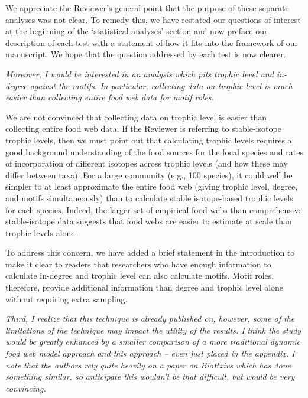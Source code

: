 \documentclass[12pt]{article}
\newcommand{\us}{\rm \setlength{\leftskip}{0.3cm} \setlength{\rightskip}{0.3cm}}
\newcommand{\them}{\it \setlength{\leftskip}{0cm} \setlength{\rightskip}{0cm}}
\begin{document}
        We appreciate the Reviewer's general point that the purpose of these separate analyses was not clear. To remedy this, we have restated our questions of interest at the beginning of the `statistical analyses' section and now preface our description of each test with a statement of how it fits into the framework of our manuscript. We hope that the question addressed by each test is now clearer.
        
        \them
        Moreover, I would be interested in an analysis which pits trophic level and in-degree against the motifs. In particular, collecting data on trophic level is much easier than collecting entire food web data for motif roles.
        
        \us
        We are not convinced that collecting data on trophic level is easier than collecting entire food web data. If the Reviewer is referring to stable-isotope trophic levels, then we must point out that calculating trophic levels requires a good background understanding of the food sources for the focal species and rates of incorporation of different isotopes across trophic levels (and how these may differ between taxa). For a large community (e.g., 100 species), it could well be simpler to at least approximate the entire food web (giving trophic level, degree, and motifs simultaneously) than to calculate stable isotope-based trophic levels for each species. Indeed, the larger set of empirical food webs than comprehensive stable-isotope data suggests that food webs are easier to estimate at scale than trophic levels alone.
        
        
        To address this concern, we have added a brief statement in the introduction to make it clear to readers that researchers who have enough information to calculate in-degree and trophic level can also calculate motifs. Motif roles, therefore, provide additional information than degree and trophic level alone without requiring extra sampling.

        
        \them
        Third, I realize that this technique is already published on, however, some of the limitations of the technique may impact the utility of the results. I think the study would be greatly enhanced by a smaller comparison of a more traditional dynamic food web model approach and this approach – even just placed in the appendix. I note that the authors rely quite heavily on a paper on BioRxivs which has done something similar, so anticipate this wouldn’t be that difficult, but would be very convincing.
        
\end{document}
